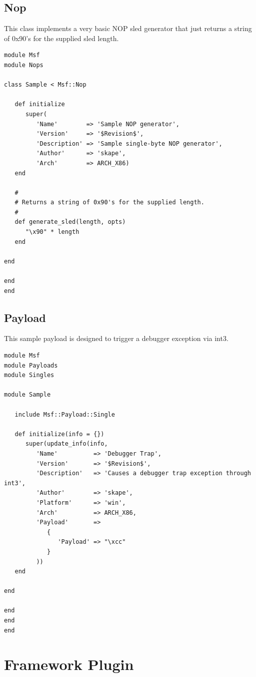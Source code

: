 \documentclass{report}
\begin{document}
        \subsection{Nop}

\par
This class implements a very basic NOP sled generator that just
returns a string of 0x90's for the supplied sled length.

\footnotesize{
\begin{verbatim}
module Msf
module Nops

class Sample < Msf::Nop

   def initialize
      super(
         'Name'        => 'Sample NOP generator',
         'Version'     => '$Revision$',
         'Description' => 'Sample single-byte NOP generator',
         'Author'      => 'skape',
         'Arch'        => ARCH_X86)
   end

   #
   # Returns a string of 0x90's for the supplied length.
   #
   def generate_sled(length, opts)
      "\x90" * length
   end

end

end
end
\end{verbatim}}

        \subsection{Payload}

\par
This sample payload is designed to trigger a debugger exception via
int3.

\footnotesize{
\begin{verbatim}
module Msf
module Payloads
module Singles

module Sample

   include Msf::Payload::Single

   def initialize(info = {})
      super(update_info(info,
         'Name'          => 'Debugger Trap',
         'Version'       => '$Revision$',
         'Description'   => 'Causes a debugger trap exception through int3',
         'Author'        => 'skape',
         'Platform'      => 'win',
         'Arch'          => ARCH_X86,
         'Payload'       =>
            {
               'Payload' => "\xcc"
            }
         ))
   end

end

end
end
end
\end{verbatim}}

    \section{Framework Plugin}
\end{document}
